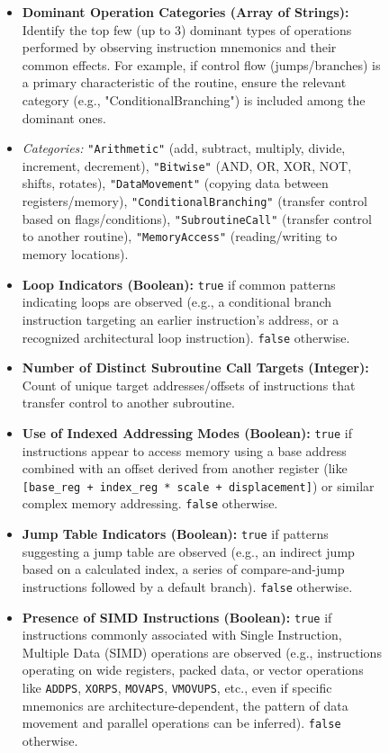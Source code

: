 \begin{figure}
{\begin{minipage}{0.95\textwidth}
    \begin{itemize}
    \item \textbf{Dominant Operation Categories (Array of Strings):} Identify the top few (up to 3) dominant types of operations performed by observing instruction mnemonics and their common effects. For example, if control flow (jumps/branches) is a primary characteristic of the routine, ensure the relevant category (e.g., "ConditionalBranching") is included among the dominant ones.
    \item \textit{Categories:} \texttt{"Arithmetic"} (add, subtract, multiply, divide, increment, decrement), \texttt{"Bitwise"} (AND, OR, XOR, NOT, shifts, rotates), \texttt{"DataMovement"} (copying data between registers/memory), \texttt{"ConditionalBranching"} (transfer control based on flags/conditions), \texttt{"SubroutineCall"} (transfer control to another routine), \texttt{"MemoryAccess"} (reading/writing to memory locations).
    \item \textbf{Loop Indicators (Boolean):} \texttt{true} if common patterns indicating loops are observed (e.g., a conditional branch instruction targeting an earlier instruction's address, or a recognized architectural loop instruction). \texttt{false} otherwise.
    \item \textbf{Number of Distinct Subroutine Call Targets (Integer):} Count of unique target addresses/offsets of instructions that transfer control to another subroutine.
    \item \textbf{Use of Indexed Addressing Modes (Boolean):} \texttt{true} if instructions appear to access memory using a base address combined with an offset derived from another register (like \texttt{[base_reg + index_reg * scale + displacement]}) or similar complex memory addressing. \texttt{false} otherwise.
    \item \textbf{Jump Table Indicators (Boolean):} \texttt{true} if patterns suggesting a jump table are observed (e.g., an indirect jump based on a calculated index, a series of compare-and-jump instructions followed by a default branch). \texttt{false} otherwise.
    \item \textbf{Presence of SIMD Instructions (Boolean):} \texttt{true} if instructions commonly associated with Single Instruction, Multiple Data (SIMD) operations are observed (e.g., instructions operating on wide registers, packed data, or vector operations like \texttt{ADDPS}, \texttt{XORPS}, \texttt{MOVAPS}, \texttt{VMOVUPS}, etc., even if specific mnemonics are architecture-dependent, the pattern of data movement and parallel operations can be inferred). \texttt{false} otherwise.
    \end{itemize}
 

\end{minipage}}
\end{figure}
